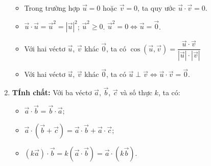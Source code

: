 \begin{enumerate}[\iconMT]
	 \begin{note}
	 \begin{itemize}
	 \item[\ding{172}] Trong trường hợp $\vec{u}=0$ hoặc $\vec{v}=0$, ta quy ước $\vec{u} \cdot \vec{v}=0$.
	 \item[\ding{173}] $\vec{u} \cdot \vec{u}=\vec{u}^2=|\vec{u}|^2$; \quad $\vec{u}^2 \geqslant 0$. $ \vec{u}^2 = 0 \Leftrightarrow \vec{u}=\vec{0}$.
	 \item[\ding{174}] Với hai véctơ $\vec{u}$, $\vec{v}$ khác $\vec{0}$, ta có $\cos (\vec{u},\vec{v}) = \dfrac{\vec{u} \cdot \vec{v}}{|\vec{u}| \cdot |\vec{v}|}$
	 \item[\ding{175}] Với hai véctơ $\vec{u}$, $\vec{v}$ khác $\vec{0}$, ta có $\vec{u} \perp \vec{v} \Leftrightarrow \vec{u} \cdot \vec{v}= \vec{0}$.
	 \end{itemize}
	 \end{note}
	\item \textbf{TÍnh chất:} Với ba véctơ $\vec{a}$, $\vec{b}$, $\vec{c}$ và số thực $k$, ta có:
	 \begin{itemize}	 
	 \item $\vec{a} \cdot \vec{b}= \vec{b} \cdot \vec{a}$;
	 \item $\vec{a} \cdot \left( {\vec{b} + \vec{c}} \right) = \vec{a} \cdot \vec{b} + \vec{a} \cdot \vec{c}$;
	 \item $(k\vec{a}) \cdot \vec{b}= k(\vec{a} \cdot \vec{b}) = \vec{a} \cdot (k\vec{b})$.
	\end{itemize}
\end{enumerate}
